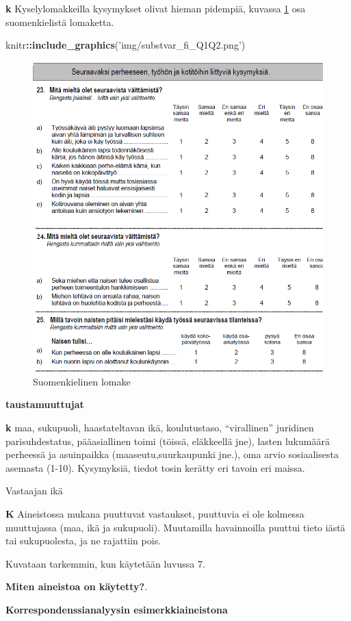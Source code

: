 \documentclass[
  finnish,
]{book}
\newenvironment{Shaded}{\begin{snugshade}}{\end{snugshade}}
\newcommand{\KeywordTok}[1]{\textcolor[rgb]{0.13,0.29,0.53}{\textbf{#1}}}
\newcommand{\NormalTok}[1]{#1}
\newcommand{\OperatorTok}[1]{\textcolor[rgb]{0.81,0.36,0.00}{\textbf{#1}}}
\newcommand{\StringTok}[1]{\textcolor[rgb]{0.31,0.60,0.02}{#1}}
\begin{document}
\textbf{k} Kyselylomakkeilla kysymykset olivat hieman pidempiä, kuvassa \ref{fig:suom-kys} osa suomenkielistä lomaketta.

\begin{Shaded}
\begin{Highlighting}[]
\NormalTok{knitr}\OperatorTok{::}\KeywordTok{include_graphics}\NormalTok{(}\StringTok{'img/substvar_fi_Q1Q2.png'}\NormalTok{)}
\end{Highlighting}
\end{Shaded}

\begin{figure}

{\centering \includegraphics[width=0.5\linewidth]{img/substvar_fi_Q1Q2} 

}

\caption{Suomenkielinen lomake}\label{fig:suom-kys}
\end{figure}

\textbf{taustamuuttujat}

\textbf{k} maa, sukupuoli, haastateltavan ikä, koulutustaso, ``virallinen'' juridinen
parisuhdestatus, pääasiallinen toimi (töissä, eläkkeellä jne), lasten lukumäärä
perheessä ja asuinpaikka (maaseutu,suurkaupunki jne.), oma arvio sosiaalisesta
asemasta (1-10). Kysymyksiä, tiedot tosin kerätty eri tavoin eri maissa.

Vastaajan ikä

\textbf{K} Aineistossa mukana puuttuvat vastaukset, puuttuvia ei ole kolmessa muuttujassa
(maa, ikä ja sukupuoli). Muutamilla havainnoilla puuttui tieto iästä tai sukupuolesta,
ja ne rajattiin pois.

Kuvataan tarkemmin, kun käytetään luvussa 7.

\textbf{Miten aineistoa on käytetty?}.

\textbf{Korrespondenssianalyysin esimerkkiaineistona}
\end{document}
